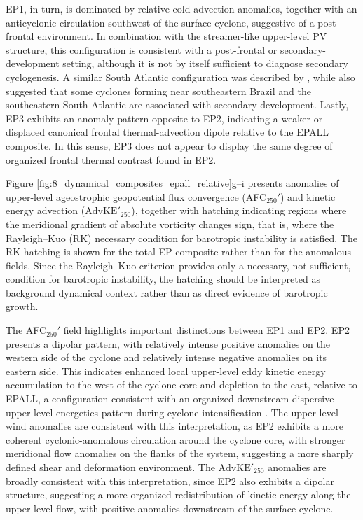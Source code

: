 \documentclass[pdflatex,sn-chicago]{sn-jnl}%
\theoremstyle{plain}
\theoremstyle{definition}
\theoremstyle{remark}
\theoremstyle{definition}
\begin{document}
EP1, in turn, is dominated by relative cold-advection anomalies, together with an anticyclonic circulation southwest of the surface cyclone, suggestive of a post-frontal environment. In combination with the streamer-like upper-level PV structure, this configuration is consistent with a post-frontal or secondary-development setting, although it is not by itself sufficient to diagnose secondary cyclogenesis. A similar South Atlantic configuration was described by \citet{iwabe2009event}, while \citet{gramcianinov2019properties} also suggested that some cyclones forming near southeastern Brazil and the southeastern South Atlantic are associated with secondary development. Lastly, EP3 exhibits an anomaly pattern opposite to EP2, indicating a weaker or displaced canonical frontal thermal-advection dipole relative to the EPALL composite. In this sense, EP3 does not appear to display the same degree of organized frontal thermal contrast found in EP2.

Figure \ref{fig:8_dynamical_composites_epall_relative}g--i presents anomalies of upper-level ageostrophic geopotential flux convergence (AFC$_{250}'$) and kinetic energy advection ($\mathrm{AdvKE'}_{250}$), together with hatching indicating regions where the meridional gradient of absolute vorticity changes sign, that is, where the Rayleigh--Kuo (RK) necessary condition for barotropic instability is satisfied. The RK hatching is shown for the total EP composite rather than for the anomalous fields. Since the Rayleigh--Kuo criterion provides only a necessary, not sufficient, condition for barotropic instability, the hatching should be interpreted as background dynamical context rather than as direct evidence of barotropic growth.

The AFC$_{250}'$ field highlights important distinctions between EP1 and EP2. EP2 presents a dipolar pattern, with relatively intense positive anomalies on the western side of the cyclone and relatively intense negative anomalies on its eastern side. This indicates enhanced local upper-level eddy kinetic energy accumulation to the west of the cyclone core and depletion to the east, relative to EPALL, a configuration consistent with an organized downstream-dispersive upper-level energetics pattern during cyclone intensification \citep{orlanski1993ageostrophic,orlanski1995stages,piva2010energetics,pinheiro2022contributions}. The upper-level wind anomalies are consistent with this interpretation, as EP2 exhibits a more coherent cyclonic-anomalous circulation around the cyclone core, with stronger meridional flow anomalies on the flanks of the system, suggesting a more sharply defined shear and deformation environment. The $\mathrm{AdvKE'}_{250}$ anomalies are broadly consistent with this interpretation, since EP2 also exhibits a dipolar structure, suggesting a more organized redistribution of kinetic energy along the upper-level flow, with positive anomalies downstream of the surface cyclone.
\end{document}
